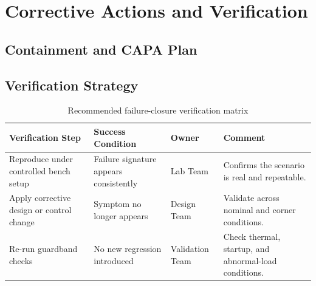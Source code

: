 \section{Corrective Actions and Verification}

\subsection{Containment and CAPA Plan}

\subsection{Verification Strategy}
\begin{table}[H]
    \centering
    \small
    \begin{tabular}{p{3.5cm} p{3.1cm} p{1.8cm} p{3.1cm}}
        \toprule
        \textbf{Verification Step} & \textbf{Success Condition} & \textbf{Owner} & \textbf{Comment} \\
        \midrule
        Reproduce under controlled bench setup & Failure signature appears consistently & Lab Team & Confirms the scenario is real and repeatable. \\
        Apply corrective design or control change & Symptom no longer appears & Design Team & Validate across nominal and corner conditions. \\
        Re-run guardband checks & No new regression introduced & Validation Team & Check thermal, startup, and abnormal-load conditions. \\
        \bottomrule
    \end{tabular}
    \caption{Recommended failure-closure verification matrix}
    \label{tab:failure-verification}
\end{table}

